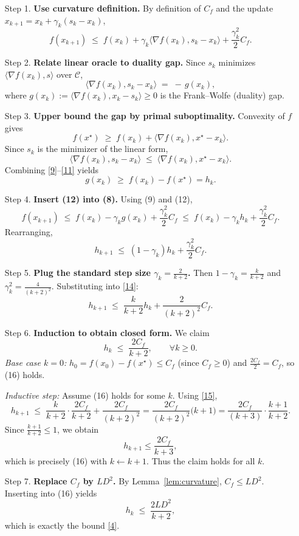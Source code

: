 \documentclass{article}
\begin{document}
\begin{enumerate}
\item[Step 1.] \textbf{Use curvature definition.} By definition of $C_f$ and the update $x_{k+1}=x_k+\gamma_k(s_k-x_k)$,
\[
f(x_{k+1}) \;\le\; f(x_k) + \gamma_k\langle\nabla f(x_k),s_k-x_k\rangle + \frac{\gamma_k^{2}}{2}C_f .
\tag{8}
\]
\item[Step 2.] \textbf{Relate linear oracle to duality gap.} Since $s_k$ minimizes $\langle\nabla f(x_k),s\rangle$ over $\mathcal{C}$,
\[
\langle\nabla f(x_k),s_k-x_k\rangle \;=\; -\,g(x_k),
\tag{9}
\]
where $g(x_k):=\langle\nabla f(x_k),x_k-s_k\rangle\ge0$ is the Frank–Wolfe (duality) gap.
\item[Step 3.] \textbf{Upper bound the gap by primal suboptimality.} Convexity of $f$ gives
\[
f(x^\star) \;\ge\; f(x_k) + \langle\nabla f(x_k),x^\star-x_k\rangle .
\tag{10}
\]
Since $s_k$ is the minimizer of the linear form,
\[
\langle\nabla f(x_k),s_k-x_k\rangle \;\le\; \langle\nabla f(x_k),x^\star-x_k\rangle .
\tag{11}
\]
Combining \eqref{9}–\eqref{11} yields
\[
g(x_k) \;\ge\; f(x_k)-f(x^\star)=h_k .
\tag{12}
\]
\item[Step 4.] \textbf{Insert (12) into (8).} Using (9) and (12),
\[
f(x_{k+1}) \;\le\; f(x_k) - \gamma_k g(x_k) + \frac{\gamma_k^{2}}{2}C_f
\;\le\; f(x_k) - \gamma_k h_k + \frac{\gamma_k^{2}}{2}C_f .
\tag{13}
\]
Rearranging,
\[
h_{k+1} \;\le\; (1-\gamma_k)h_k + \frac{\gamma_k^{2}}{2}C_f .
\tag{14}
\]
\item[Step 5.] \textbf{Plug the standard step size $\gamma_k=\frac{2}{k+2}$.} Then $1-\gamma_k=\frac{k}{k+2}$ and $\gamma_k^{2}=\frac{4}{(k+2)^{2}}$. Substituting into \eqref{14}:
\[
h_{k+1} \;\le\; \frac{k}{k+2}h_k + \frac{2}{(k+2)^{2}}C_f .
\tag{15}
\]
\item[Step 6.] \textbf{Induction to obtain closed form.} We claim
\[
h_k \;\le\; \frac{2C_f}{k+2},\qquad \forall k\ge0 .
\tag{16}
\]
\emph{Base case $k=0$:} $h_0 = f(x_0)-f(x^\star)\le C_f$ (since $C_f\ge0$) and $\frac{2C_f}{2}=C_f$, so (16) holds.

\emph{Inductive step:} Assume (16) holds for some $k$. Using \eqref{15},
\[
h_{k+1} \;\le\; \frac{k}{k+2}\cdot\frac{2C_f}{k+2}+ \frac{2C_f}{(k+2)^{2}}
= \frac{2C_f}{(k+2)^{2}}\bigl(k+1\bigr)
= \frac{2C_f}{(k+3)}\cdot\frac{k+1}{k+2}.
\]
Since $\frac{k+1}{k+2}\le 1$, we obtain
\[
h_{k+1} \le \frac{2C_f}{k+3},
\]
which is precisely (16) with $k\leftarrow k+1$. Thus the claim holds for all $k$.
\item[Step 7.] \textbf{Replace $C_f$ by $L D^{2}$.} By Lemma~\ref{lem:curvature}, $C_f\le L D^{2}$. Inserting into (16) yields
\[
h_k \;\le\; \frac{2L D^{2}}{k+2},
\]
which is exactly the bound \eqref{4}. \qedhere
\end{enumerate}
\end{document}
